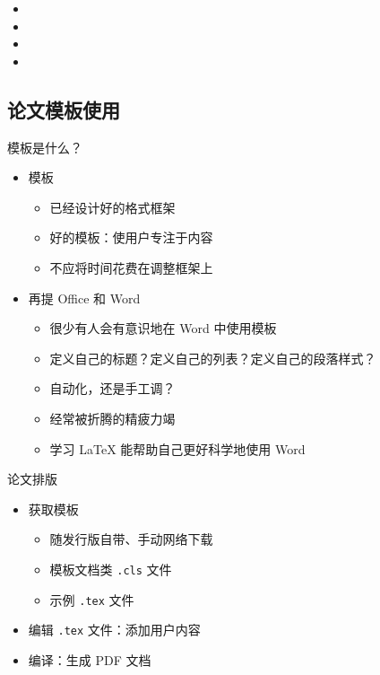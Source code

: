 \begin{frame}[fragile]
\begin{multicols}{3}
\begin{itemize}
        \begin{itemize}
          \item {}
          \item {}
          \item {}
          \item {}
        \end{itemize}
    \end{itemize}
  \end{multicols}
  \vspace*{-0.5cm}
\end{frame}

\subsection{论文模板使用}

\begin{frame}{模板是什么？}
  \begin{itemize}
    \item 模板
      \begin{itemize}
        \item 已经设计好的格式框架
        \item 好的模板：使用户专注于内容
        \item 不应将时间花费在调整框架上
      \end{itemize}
    \item 再提 Office 和 Word
      \begin{itemize}
        \item 很少有人会有意识地在 Word 中使用模板
        \item 定义自己的标题？定义自己的列表？定义自己的段落样式？
        \item 自动化，还是手工调？
        \item 经常被折腾的精疲力竭
        \item 学习 \LaTeX{} 能帮助自己更好科学地使用 Word
      \end{itemize}
  \end{itemize}
\end{frame}

\begin{frame}{论文排版}
  \begin{itemize}
    \item 获取模板
      \begin{itemize}
        \item 随发行版自带、手动网络下载
        \item 模板文档类 \texttt{.cls} 文件
        \item 示例 \texttt{.tex} 文件
      \end{itemize}
    \item 编辑 \texttt{.tex} 文件：添加用户内容
    \item 编译：生成 PDF 文档
  \end{itemize}
\end{frame}

